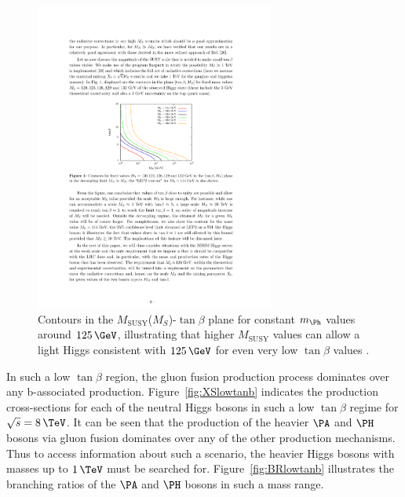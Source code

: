 \begin{figure}[htbp]
   \includegraphics[width=0.7\textwidth]{plots/theory/MSUSY_tanb.pdf}
\caption[Contours in the $M_{\text{SUSY}}$-$\tan\beta$ plane for
constant $m_{\Ph}$ values around $125\,\GeV$.]{Contours in the $M_{\text{SUSY}}$($M_{S}$)-$\tan\beta$ plane for
constant $m_{\Ph}$ values around $125\,\GeV$, illustrating that higher
$M_{\text{SUSY}}$ values can allow a light Higgs consistent with $125\,\GeV$ for
even very low $\tan\beta$ values \cite{Djouadi:2013vqa}.}
\label{fig:MSUSYcontours}
\end{figure}

In such a low $\tan\beta$ region, the gluon fusion production process dominates
over any b-associated production. Figure~\ref{fig:XSlowtanb} indicates the
production cross-sections for each of the neutral Higgs bosons in such a low
$\tan\beta$ regime for $\sqrt{s}=8\,\TeV$. It can be seen that the production of
the heavier $\PA$ and $\PH$ bosons via gluon fusion dominates over any of the
other production mechanisms. Thus to access information about such a scenario,
the heavier Higgs bosons with masses up to $1\,\TeV$ must be searched for.
Figure~\ref{fig:BRlowtanb} illustrates the branching ratios of the $\PA$ and
$\PH$ bosons in such a mass range. 

